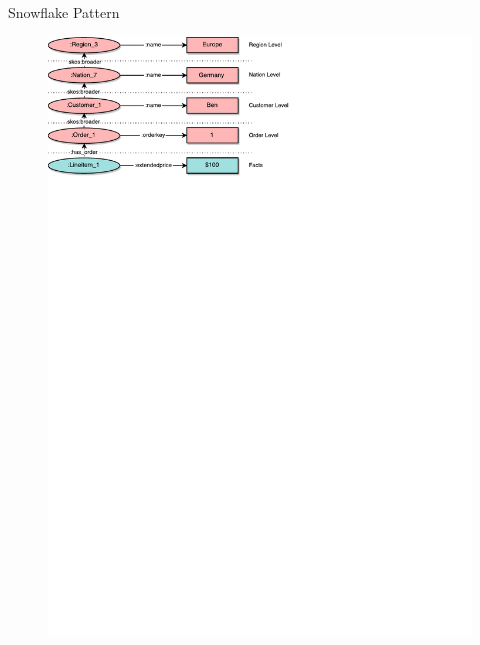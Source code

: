 \begin{frame}{\patsec}{Snowflake Pattern}
    \begin{figure}
        \includegraphics[trim=0 648 255 0,clip,width=1\textwidth]{images/snowflakepattern.pdf}
    \end{figure}
\end{frame}

%    
%

